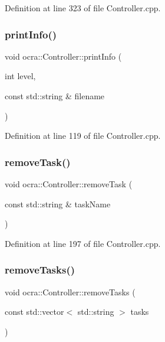 Definition at line 323 of file Controller.\+cpp.

\hypertarget{classocra_1_1Controller_ad05741095a1e8f741cd3d4d67b40e239}{}\label{classocra_1_1Controller_ad05741095a1e8f741cd3d4d67b40e239} 
\subsubsection{\texorpdfstring{print\+Info()}{printInfo()}}
{\footnotesize\ttfamily void ocra\+::\+Controller\+::print\+Info (\begin{DoxyParamCaption}\item[{int}]{level,  }\item[{const std\+::string \&}]{filename }\end{DoxyParamCaption})}



Definition at line 119 of file Controller.\+cpp.

\hypertarget{classocra_1_1Controller_a0794b232fe416785b6bfb9e5e380424f}{}\label{classocra_1_1Controller_a0794b232fe416785b6bfb9e5e380424f} 
\subsubsection{\texorpdfstring{remove\+Task()}{removeTask()}}
{\footnotesize\ttfamily void ocra\+::\+Controller\+::remove\+Task (\begin{DoxyParamCaption}\item[{const std\+::string \&}]{task\+Name }\end{DoxyParamCaption})}



Definition at line 197 of file Controller.\+cpp.

\hypertarget{classocra_1_1Controller_ad0e1a54d26697be34348d8fb85b368d4}{}\label{classocra_1_1Controller_ad0e1a54d26697be34348d8fb85b368d4} 
\subsubsection{\texorpdfstring{remove\+Tasks()}{removeTasks()}}
{\footnotesize\ttfamily void ocra\+::\+Controller\+::remove\+Tasks (\begin{DoxyParamCaption}\item[{const std\+::vector$<$ std\+::string $>$}]{tasks }\end{DoxyParamCaption})}



